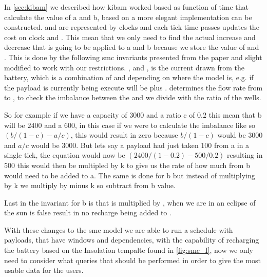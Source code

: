 In \cref{sec:kibam} we described how \gls{kibam} worked based as function of time that calculate the value of a and b, based on \cite{battery_aware_scheduling} a more elegant implementation can be constructed. 
 and  are represented by clocks and each tick time passes updates the cost on clock  and . This mean that we only need to find the actual increase and decrease that is going to be applied to a and b because we store the value of  and . This is done by the following \gls{smc} invariants presented from the paper and slight modified to work with our restrictions. , and ,  is the current drawn from the battery, which is a combination of  and  depending on where the model is, e.g. if the payload is currently being execute  will be  plus .  determines the flow rate from  to , to check the imbalance between the  and  we divide with the ratio of the wells. 

So for example if we have a capacity of $3000$ and a ratio c of $0.2$ this mean that b will be $2400$ and a $600$, in this case if we were to calculate the imbalance like so $(b/(1-c)-a/c)$, this would result in zero because $b/(1-c)$ would be $3000$ and $a/c$ would be $3000$. But lets say a payload had just taken 100 from a in a single tick, the equation would now be $(2400/(1-0.2)-500/0.2)$ resulting in $500$ this would then be multipled by k to give us the rate of how much from b would need to be added to a. The same is done for b but instead of multiplying by k we multiply by minus k so subtract from b value.

Last in the invariant for b is  that is multiplied by , when we are in an eclipse of the sun  is false result in no recharge being added to .


With these changes to the \gls{smc} model we are able to run a schedule with payloads, that have windows and dependencies, with the capability of recharging the battery based on the Insolation tempalte found in \cref{fig:smc_I}, now we only need to consider what queries that should be performed in order to give the most usable data for the users.


